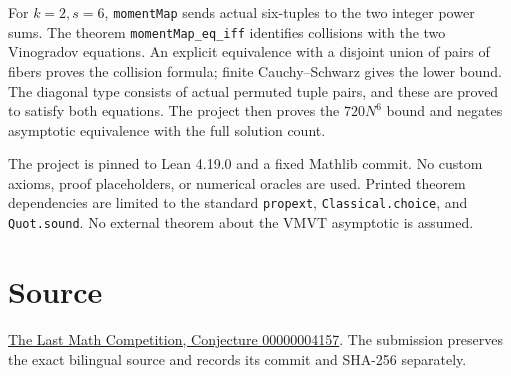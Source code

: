 \documentclass[11pt]{article}
\begin{document}
For $k=2,s=6$, \texttt{momentMap} sends actual six-tuples to the two integer power sums. The theorem \texttt{momentMap\_eq\_iff} identifies collisions with the two Vinogradov equations. An explicit equivalence with a disjoint union of pairs of fibers proves the collision formula; finite Cauchy--Schwarz gives the lower bound. The diagonal type consists of actual permuted tuple pairs, and these are proved to satisfy both equations. The project then proves the $720N^6$ bound and negates asymptotic equivalence with the full solution count.

The project is pinned to Lean 4.19.0 and a fixed Mathlib commit. No custom axioms, proof placeholders, or numerical oracles are used. Printed theorem dependencies are limited to the standard \texttt{propext}, \texttt{Classical.choice}, and \texttt{Quot.sound}. No external theorem about the VMVT asymptotic is assumed.

\section*{Source}
\href{https://github.com/The-Last-Math-Competition/The-Last-Math-Competition/blob/main/conjectures/00000004157.md}{The Last Math Competition, Conjecture 00000004157}. The submission preserves the exact bilingual source and records its commit and SHA-256 separately.
\end{document}
